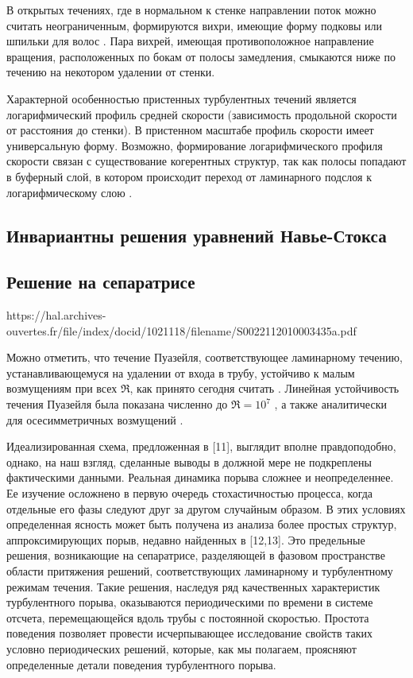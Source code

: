 В открытых течениях, где в нормальном к стенке направлении поток можно считать неограниченным, формируются вихри, имеющие форму подковы или шпильки для волос \cite{Head1981, Robinson1991, Adrian2000, Adrian2007}. Пара вихрей, имеющая противоположное направление вращения, расположенных по бокам от полосы замедления, смыкаются ниже по течению на некотором удалении от стенки. 

Характерной особенностью пристенных турбулентных течений является логарифмический профиль средней скорости (зависимость продольной скорости от расстояния до стенки). В пристенном масштабе профиль скорости имеет универсальную форму. Возможно, формирование логарифмического профиля скорости связан с существование когерентных структур, так как полосы попадают в буферный слой, в котором происходит переход от ламинарного подслоя к логарифмическому слою \cite{}. 


	\subsection{Инвариантны решения уравнений Навье-Стокса}



	\subsection{Решение на сепаратрисе}


https://hal.archives-ouvertes.fr/file/index/docid/1021118/filename/S0022112010003435a.pdf

Можно отметить, что течение Пуазейля, соответствующее ламинарному течению, устанавливающемуся на удалении от входа в трубу, устойчиво к малым возмущениям при всех $\Re$, как принято сегодня считать \cite{Kerswell2005}. Линейная устойчивость течения Пуазейля была показана численно до $\Re=10^7$ \cite{Meseguer2003}, а также аналитически для осесимметричных возмущений \cite{Salwen1980}. 

Идеализированная схема, предложенная в [11], выглядит вполне правдоподобно, однако, на наш взгляд, сделанные выводы в должной мере не подкреплены фактическими данными. Реальная динамика порыва сложнее и неопределеннее. Ее изучение осложнено в первую очередь стохастичностью процесса, когда отдельные его фазы следуют друг за другом случайным образом. В этих условиях определенная ясность может быть получена из анализа более простых структур, аппроксимирующих порыв, недавно найденных в [12,13]. Это предельные решения, возникающие на сепаратрисе, разделяющей в фазовом пространстве области притяжения решений, соответствующих ламинарному и турбулентному режимам течения. Такие решения, наследуя ряд качественных характеристик турбулентного порыва, оказываются периодическими по времени в системе отсчета, перемещающейся вдоль трубы с постоянной скоростью. Простота поведения позволяет провести исчерпывающее исследование свойств таких условно периодических решений, которые, как мы полагаем, проясняют определенные детали поведения турбулентного порыва.


